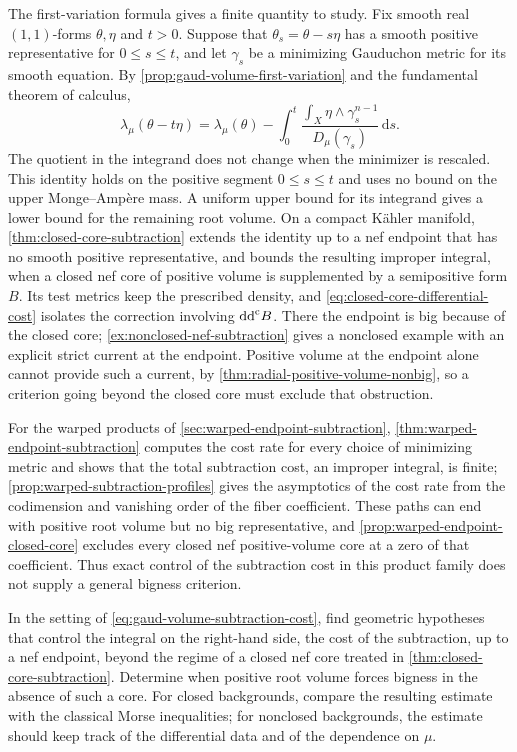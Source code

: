 The first-variation formula gives a finite quantity to study. Fix smooth real $(1,1)$-forms $\theta,\eta$ and $t>0$. Suppose that $\theta_s=\theta-s\eta$ has a smooth positive representative for $0\leq s\leq t$, and let $\gamma_s$ be a minimizing Gauduchon metric for its smooth equation. By \cref{prop:gaud-volume-first-variation} and the fundamental theorem of calculus,
\begin{equation}\label{eq:gaud-volume-subtraction-cost}
 \lambda_\mu(\theta-t\eta)
 =\lambda_\mu(\theta)
   -\int_0^t
       \frac{\int_X\eta\wedge\gamma_s^{n-1}}
            {D_\mu(\gamma_s)}\,\mathrm{d}s.
\end{equation}
The quotient in the integrand does not change when the minimizer is rescaled. This identity holds on the positive segment $0\leq s\leq t$ and uses no bound on the upper Monge--Amp\`ere mass. A uniform upper bound for its integrand gives a lower bound for the remaining root volume. On a compact K\"ahler manifold, \cref{thm:closed-core-subtraction} extends the identity up to a nef endpoint that has no smooth positive representative, and bounds the resulting improper integral, when a closed nef core of positive volume is supplemented by a semipositive form $B$. Its test metrics keep the prescribed density, and \eqref{eq:closed-core-differential-cost} isolates the correction involving $\mathrm{dd}^{\mathrm{c}} B$. There the endpoint is big because of the closed core; \cref{ex:nonclosed-nef-subtraction} gives a nonclosed example with an explicit strict current at the endpoint. Positive volume at the endpoint alone cannot provide such a current, by \cref{thm:radial-positive-volume-nonbig}, so a criterion going beyond the closed core must exclude that obstruction.

For the warped products of \cref{sec:warped-endpoint-subtraction}, \cref{thm:warped-endpoint-subtraction} computes the cost rate for every choice of minimizing metric and shows that the total subtraction cost, an improper integral, is finite; \cref{prop:warped-subtraction-profiles} gives the asymptotics of the cost rate from the codimension and vanishing order of the fiber coefficient. These paths can end with positive root volume but no big representative, and \cref{prop:warped-endpoint-closed-core} excludes every closed nef positive-volume core at a zero of that coefficient. Thus exact control of the subtraction cost in this product family does not supply a general bigness criterion.

\begin{problem}\label{qu:hermitian-morse-program}
In the setting of \eqref{eq:gaud-volume-subtraction-cost}, find geometric hypotheses that control the integral on the right-hand side, the cost of the subtraction, up to a nef endpoint, beyond the regime of a closed nef core treated in \cref{thm:closed-core-subtraction}. Determine when positive root volume forces bigness in the absence of such a core. For closed backgrounds, compare the resulting estimate with the classical Morse inequalities; for nonclosed backgrounds, the estimate should keep track of the differential data and of the dependence on $\mu$.
\end{problem}

